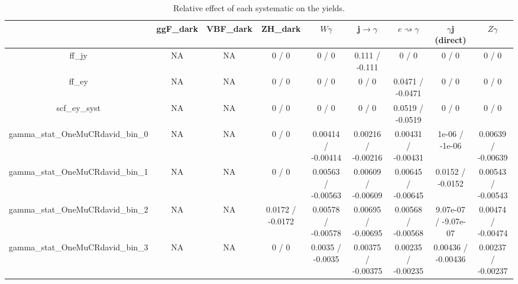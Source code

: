 \documentclass[10pt]{article}
\begin{document}
\begin{table}[htbp]
\begin{center}
\begin{tabular}{|c|c|c|c|c|c|c|c|c|}
\hline 
      & ggF_{dark}      & VBF_{dark}      & ZH_{dark}      & $W\gamma$      & j$\rightarrow\gamma$      & $e\rightsquigarrow\gamma$      & $\gamma$j (direct)      & $Z\gamma$ \\ 
\hline 
  ff_jy &    NA    &    NA    & 0 / 0 & 0 / 0 & 0.111 / -0.111 & 0 / 0 & 0 / 0 & 0 / 0 \\ 
  ff_ey &    NA    &    NA    & 0 / 0 & 0 / 0 & 0 / 0 & 0.0471 / -0.0471 & 0 / 0 & 0 / 0 \\ 
  scf_ey_syst &    NA    &    NA    & 0 / 0 & 0 / 0 & 0 / 0 & 0.0519 / -0.0519 & 0 / 0 & 0 / 0 \\ 
  gamma_stat_OneMuCRdavid_bin_0 &    NA    &    NA    & 0 / 0 & 0.00414 / -0.00414 & 0.00216 / -0.00216 & 0.00431 / -0.00431 & 1e-06 / -1e-06 & 0.00639 / -0.00639 \\ 
  gamma_stat_OneMuCRdavid_bin_1 &    NA    &    NA    & 0 / 0 & 0.00563 / -0.00563 & 0.00609 / -0.00609 & 0.00645 / -0.00645 & 0.0152 / -0.0152 & 0.00543 / -0.00543 \\ 
  gamma_stat_OneMuCRdavid_bin_2 &    NA    &    NA    & 0.0172 / -0.0172 & 0.00578 / -0.00578 & 0.00695 / -0.00695 & 0.00568 / -0.00568 & 9.07e-07 / -9.07e-07 & 0.00474 / -0.00474 \\ 
  gamma_stat_OneMuCRdavid_bin_3 &    NA    &    NA    & 0 / 0 & 0.0035 / -0.0035 & 0.00375 / -0.00375 & 0.00235 / -0.00235 & 0.00436 / -0.00436 & 0.00237 / -0.00237 \\ 
\hline 
\end{tabular} 
\caption{Relative effect of each systematic on the yields.} 
\end{center} 
\end{table} 
\end{document}
